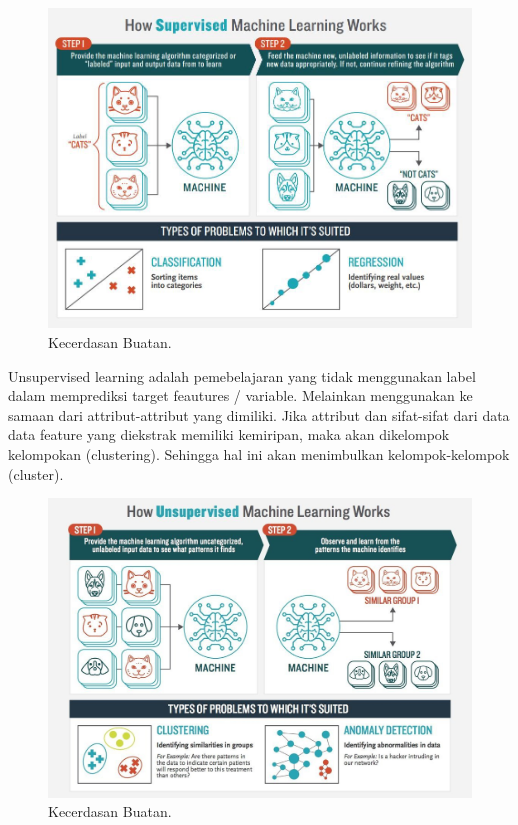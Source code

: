 \hfill\break
\begin{figure}[H]
    \includegraphics[width=1\textwidth]{figures/1174006/chapter2/teori/2.png}
    \centering
    \caption{Kecerdasan Buatan.}
\end{figure}

\noindent
Unsupervised learning adalah pemebelajaran yang tidak menggunakan label dalam memprediksi target feautures / variable. Melainkan menggunakan ke samaan dari attribut-attribut yang dimiliki. Jika attribut dan sifat-sifat dari data data feature yang diekstrak memiliki kemiripan, maka akan dikelompok kelompokan (clustering). Sehingga hal ini akan menimbulkan kelompok-kelompok (cluster).

\hfill\break
\begin{figure}[H]
    \includegraphics[width=1\textwidth]{figures/1174006/chapter2/teori/3.png}
    \centering
    \caption{Kecerdasan Buatan.}
\end{figure}

